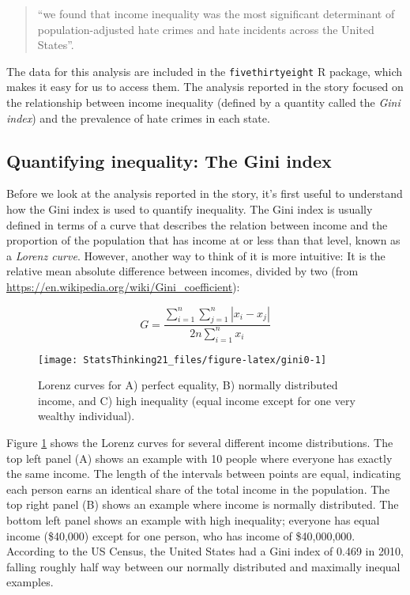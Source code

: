 \documentclass[]{book}
\theoremstyle{definition}
\theoremstyle{definition}
\theoremstyle{definition}
\theoremstyle{remark}
\begin{document}
\begin{quote}
``we found that income inequality was the most significant determinant
of population-adjusted hate crimes and hate incidents across the United
States''.
\end{quote}

The data for this analysis are included in the \texttt{fivethirtyeight}
R package, which makes it easy for us to access them. The analysis
reported in the story focused on the relationship between income
inequality (defined by a quantity called the \emph{Gini index}) and the
prevalence of hate crimes in each state.

\subsection{Quantifying inequality: The Gini
index}\label{quantifying-inequality-the-gini-index}

Before we look at the analysis reported in the story, it's first useful
to understand how the Gini index is used to quantify inequality. The
Gini index is usually defined in terms of a curve that describes the
relation between income and the proportion of the population that has
income at or less than that level, known as a \emph{Lorenz curve}.
However, another way to think of it is more intuitive: It is the
relative mean absolute difference between incomes, divided by two (from
\url{https://en.wikipedia.org/wiki/Gini_coefficient}):

\[
G = \frac{\displaystyle{\sum_{i=1}^n \sum_{j=1}^n \left| x_i - x_j \right|}}{\displaystyle{2n\sum_{i=1}^n x_i}} 
\]

\begin{figure}
\texttt{[image: StatsThinking21\_files/figure-latex/gini0-1]} \caption{Lorenz curves for A) perfect equality, B) normally distributed income, and C) high inequality (equal income except for one very wealthy individual).}\label{fig:gini0}
\end{figure}

Figure \ref{fig:gini0} shows the Lorenz curves for several different
income distributions. The top left panel (A) shows an example with 10
people where everyone has exactly the same income. The length of the
intervals between points are equal, indicating each person earns an
identical share of the total income in the population. The top right
panel (B) shows an example where income is normally distributed. The
bottom left panel shows an example with high inequality; everyone has
equal income (\$40,000) except for one person, who has income of
\$40,000,000. According to the US Census, the United States had a Gini
index of 0.469 in 2010, falling roughly half way between our normally
distributed and maximally inequal examples.
\end{document}
